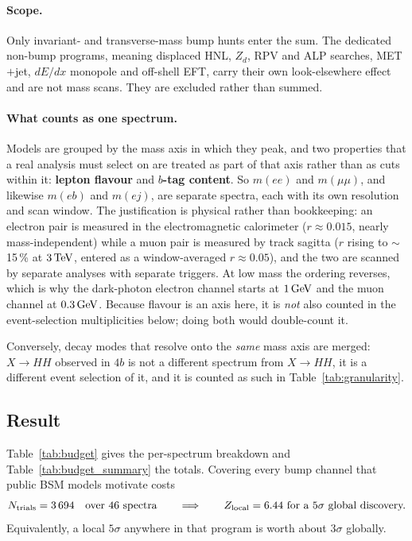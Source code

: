 \paragraph{Scope.} Only invariant- and transverse-mass bump hunts enter the sum. The dedicated
non-bump programs, meaning displaced HNL, $Z_d$, RPV and ALP searches, MET$+$jet, $dE/dx$ monopole
and off-shell EFT, carry their own look-elsewhere effect and are not mass scans. They are excluded
rather than summed.

\paragraph{What counts as one spectrum.} Models are grouped by the mass axis in which they peak,
and two properties that a real analysis must select on are treated as part of that axis rather than
as cuts within it: \textbf{lepton flavour} and \textbf{$b$-tag content}. So $m(ee)$ and
$m(\mu\mu)$, and likewise $m(eb)$ and $m(ej)$, are separate spectra, each with its own resolution
and scan window. The justification is physical rather than bookkeeping: an electron pair is
measured in the electromagnetic calorimeter ($r \approx 0.015$, nearly mass-independent) while a
muon pair is measured by track sagitta ($r$ rising to $\sim$15\,\% at $3\,\mathrm{TeV}$, entered as a
window-averaged $r \approx 0.05$), and the two are scanned by separate analyses with separate
triggers. At low mass the ordering reverses, which is why the dark-photon electron channel starts
at $1\,\mathrm{GeV}$ and the muon channel at $0.3\,\mathrm{GeV}$. Because flavour is an axis here, it is \emph{not}
also counted in the event-selection multiplicities below; doing both would double-count it.

Conversely, decay modes that resolve onto the \emph{same} mass axis are merged: $X \to HH$ observed
in $4b$ is not a different spectrum from $X \to HH$, it is a different event selection of it, and it
is counted as such in Table~\ref{tab:granularity}.

\subsection{Result}

Table~\ref{tab:budget} gives the per-spectrum breakdown and Table~\ref{tab:budget_summary} the
totals. Covering every bump channel that public BSM models motivate costs
\begin{equation*}
  N_{\mathrm{trials}} = 3\,694 \quad\text{over 46 spectra}
  \qquad\Longrightarrow\qquad
  Z_{\mathrm{local}} = 6.44 \ \text{for a } 5\sigma \text{ global discovery.}
\end{equation*}
Equivalently, a local $5\sigma$ anywhere in that program is worth about $3\sigma$ globally.

